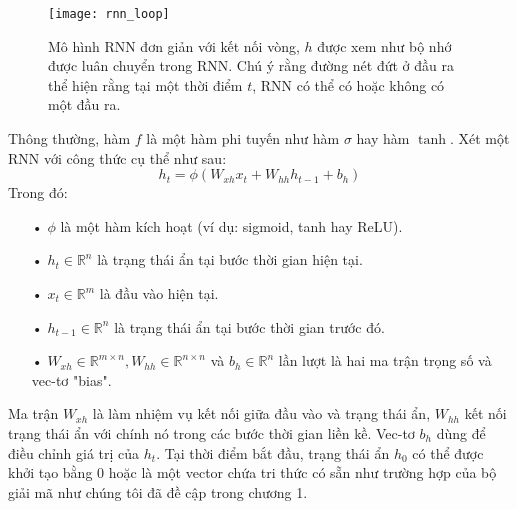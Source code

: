 \begin{figure}
	\centering
	\texttt{[image: rnn\_loop]}
	\caption[Mô hình RNN với kết nối vòng]{Mô hình RNN đơn giản với kết nối vòng, \textbf{$h$} được xem như bộ nhớ được luân chuyển trong RNN. Chú ý rằng đường nét đứt ở đầu ra thể hiện rằng tại một thời điểm $t$, RNN có thể có hoặc không có một đầu ra.}
	\label{fig_rnn_loop}
\end{figure}
Thông thường, hàm $f$ là một hàm phi tuyến như hàm \textit{$\sigma$} hay hàm \textit{$\tanh$}. Xét một RNN với công thức cụ thể như sau:
\begin{equation} \label{rnnWithTanh}
	h_t = \phi \left(W_{xh} x_t + W_{hh}h_{t-1} + b_h \right)
\end{equation}
Trong đó:
\begin{itemize}
	\item[•] $\phi$ là một hàm kích hoạt (ví dụ: sigmoid, tanh hay ReLU).
	\item[•] $h_{t} \in \mathbb{R}^n$ là trạng thái ẩn tại bước thời gian hiện tại.
	\item[•] $x_t \in \mathbb{R}^m$ là đầu vào hiện tại.
	\item[•] $h_{t-1} \in \mathbb{R}^n$ là trạng thái ẩn tại bước thời gian trước đó.
	\item[•] $W_{xh} \in \mathbb{R}^{m \times n}, W_{hh} \in \mathbb{R}^{n \times n}$ và $b_h \in \mathbb{R}^n$ lần lượt là hai ma trận trọng số và vec-tơ "bias".
\end{itemize}

Ma trận $W_{xh}$ là làm nhiệm vụ kết nối giữa đầu vào và trạng thái ẩn, $W_{hh}$ kết nối trạng thái ẩn với chính nó trong các bước thời gian liền kề. Vec-tơ $b_h$ dùng để điều chỉnh giá trị của $h_t$. Tại thời điểm bắt đầu, trạng thái ẩn $h_0$ có thể được khởi tạo bằng 0 hoặc là một vector chứa tri thức có sẵn như trường hợp của bộ giải mã như chúng tôi đã đề cập trong chương 1.

